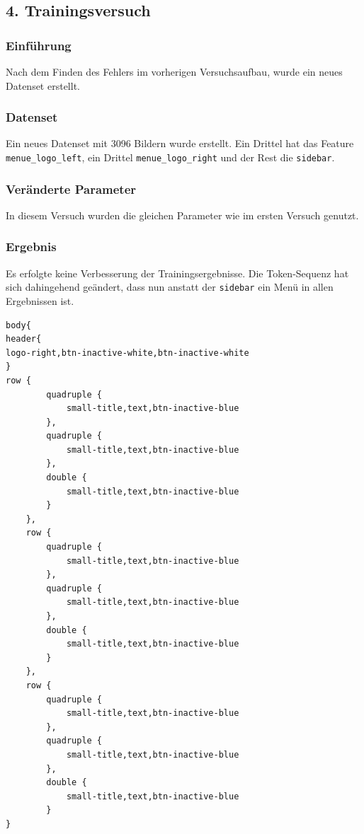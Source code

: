 \documentclass[pdftex,a4paper,halfparskip, article]{scrartcl}
\begin{document}
\subsection{4. Trainingsversuch}


\subsubsection*{Einführung}

Nach dem Finden des Fehlers im vorherigen Versuchsaufbau, wurde ein neues Datenset erstellt.

\subsubsection*{Datenset}

Ein neues Datenset mit 3096 Bildern wurde erstellt. Ein Drittel hat das Feature \texttt{menue\_logo\_left}, ein Drittel \texttt{menue\_logo\_right} und der Rest die \texttt{sidebar}. 

\subsubsection*{Veränderte Parameter}

In diesem Versuch wurden die gleichen Parameter wie im ersten Versuch genutzt.

\subsubsection*{Ergebnis}

Es erfolgte keine Verbesserung der Trainingsergebnisse. Die Token-Sequenz hat sich dahingehend geändert, dass nun anstatt der \texttt{sidebar} ein Menü in allen Ergebnissen ist.

\begin{verbatim}
body{
header{
logo-right,btn-inactive-white,btn-inactive-white
}
row {
		quadruple {
			small-title,text,btn-inactive-blue
		},
		quadruple {
			small-title,text,btn-inactive-blue
		},
		double {
			small-title,text,btn-inactive-blue
		}
	},
	row {
		quadruple {
			small-title,text,btn-inactive-blue
		},
		quadruple {
			small-title,text,btn-inactive-blue
		},
		double {
			small-title,text,btn-inactive-blue
		}
	},
	row {
		quadruple {
			small-title,text,btn-inactive-blue
		},
		quadruple {
			small-title,text,btn-inactive-blue
		},
		double {
			small-title,text,btn-inactive-blue
		}
}
\end{verbatim}
\end{document}
